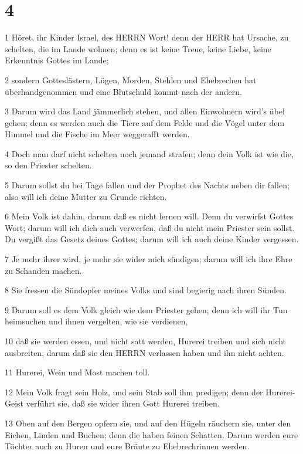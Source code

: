 \chapter{4}

\par 1 Höret, ihr Kinder Israel, des HERRN Wort! denn der HERR hat Ursache, zu schelten, die im Lande wohnen; denn es ist keine Treue, keine Liebe, keine Erkenntnis Gottes im Lande;
\par 2 sondern Gotteslästern, Lügen, Morden, Stehlen und Ehebrechen hat überhandgenommen und eine Blutschuld kommt nach der andern.
\par 3 Darum wird das Land jämmerlich stehen, und allen Einwohnern wird's übel gehen; denn es werden auch die Tiere auf dem Felde und die Vögel unter dem Himmel und die Fische im Meer weggerafft werden.
\par 4 Doch man darf nicht schelten noch jemand strafen; denn dein Volk ist wie die, so den Priester schelten.
\par 5 Darum sollst du bei Tage fallen und der Prophet des Nachts neben dir fallen; also will ich deine Mutter zu Grunde richten.
\par 6 Mein Volk ist dahin, darum daß es nicht lernen will. Denn du verwirfst Gottes Wort; darum will ich dich auch verwerfen, daß du nicht mein Priester sein sollst. Du vergißt das Gesetz deines Gottes; darum will ich auch deine Kinder vergessen.
\par 7 Je mehr ihrer wird, je mehr sie wider mich sündigen; darum will ich ihre Ehre zu Schanden machen.
\par 8 Sie fressen die Sündopfer meines Volks und sind begierig nach ihren Sünden.
\par 9 Darum soll es dem Volk gleich wie dem Priester gehen; denn ich will ihr Tun heimsuchen und ihnen vergelten, wie sie verdienen,
\par 10 daß sie werden essen, und nicht satt werden, Hurerei treiben und sich nicht ausbreiten, darum daß sie den HERRN verlassen haben und ihn nicht achten.
\par 11 Hurerei, Wein und Most machen toll.
\par 12 Mein Volk fragt sein Holz, und sein Stab soll ihm predigen; denn der Hurerei-Geist verführt sie, daß sie wider ihren Gott Hurerei treiben.
\par 13 Oben auf den Bergen opfern sie, und auf den Hügeln räuchern sie, unter den Eichen, Linden und Buchen; denn die haben feinen Schatten. Darum werden eure Töchter auch zu Huren und eure Bräute zu Ehebrechrinnen werden.
